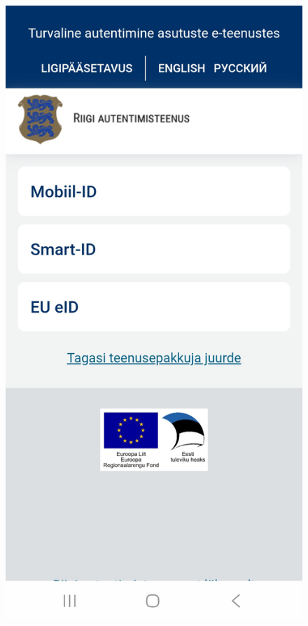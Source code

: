 \begin{figure}[H]
\begin{minipage}{0.32\textwidth}
    \includegraphics[width=\textwidth]{english/figures/Screenshot_20250812_212238_Data Access Notifier.jpg}
\end{minipage}%
\hfill

\end{figure}

